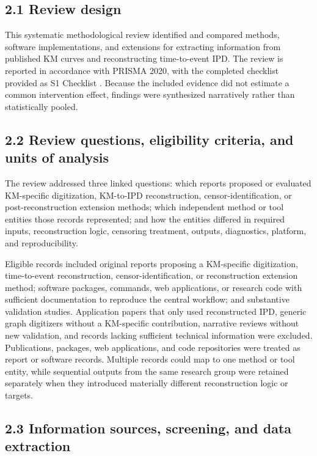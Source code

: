 \documentclass[10pt,letterpaper]{article}
\begin{document}
\subsection*{2.1 Review design}

This systematic methodological review identified and compared methods, software implementations, and extensions for extracting information from published KM curves and reconstructing time-to-event IPD. The review is reported in accordance with PRISMA 2020, with the completed checklist provided as S1 Checklist \cite{page2021}. Because the included evidence did not estimate a common intervention effect, findings were synthesized narratively rather than statistically pooled.

\subsection*{2.2 Review questions, eligibility criteria, and units of analysis}

The review addressed three linked questions: which reports proposed or evaluated KM-specific digitization, KM-to-IPD reconstruction, censor-identification, or post-reconstruction extension methods; which independent method or tool entities those records represented; and how the entities differed in required inputs, reconstruction logic, censoring treatment, outputs, diagnostics, platform, and reproducibility.

Eligible records included original reports proposing a KM-specific digitization, time-to-event reconstruction, censor-identification, or reconstruction extension method; software packages, commands, web applications, or research code with sufficient documentation to reproduce the central workflow; and substantive validation studies. Application papers that only used reconstructed IPD, generic graph digitizers without a KM-specific contribution, narrative reviews without new validation, and records lacking sufficient technical information were excluded. Publications, packages, web applications, and code repositories were treated as report or software records. Multiple records could map to one method or tool entity, while sequential outputs from the same research group were retained separately when they introduced materially different reconstruction logic or targets.

\subsection*{2.3 Information sources, screening, and data extraction}
\end{document}
